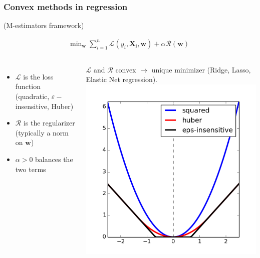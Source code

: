 \begin{frame}
\frametitle{Convex methods in regression}

(M-estimators framework)

\begin{align*}
\text{min}_{\mathbf{w}} \; \sum_{i=1}^n \mathcal{L}(y_i,\mathbf{X_i},\mathbf{w}) + \alpha \mathcal{R} (\mathbf{w})
\end{align*}


\begin{columns}
\begin{itemize}
\item $\mathcal{L}$ is the loss function (quadratic, $\varepsilon-$insensitive, Huber)
\item $\mathcal{R}$ is the regularizer (typically a norm on $\mathbf{w}$)
\item $\alpha > 0$ balances the two terms
\end{itemize}
$\mathcal{L}$ and $\mathcal{R}$ convex $\rightarrow$ unique minimizer (Ridge, Lasso, Elastic Net regression).
\includegraphics[width=\textwidth]{sklearn_material/losses.png}

\end{columns}
\end{frame}


